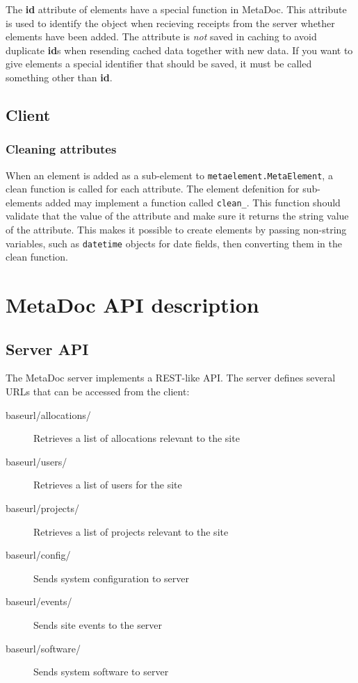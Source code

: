 \documentclass[titlepage, a4paper,10pt]{article}
\begin{document}
The \textbf{id} attribute of elements have a special function in MetaDoc. This 
attribute is used to identify the object when recieving receipts from the server 
whether elements have been added. The attribute is \textit{not} saved in caching 
to avoid duplicate \textbf{id}s when resending cached data together with new 
data. If you want to give elements a special identifier that should be saved, it 
must be called something other than \textbf{id}.

\subsection{Client}

\subsubsection{Cleaning attributes}

When an element is added as a sub-element to \texttt{metaelement.MetaElement}, a 
clean function is called for each attribute. The element defenition for 
sub-elements added may implement a function called 
\texttt{clean\_<attribute name>}. This function should validate that the value 
of the attribute and make sure it returns the string value of the attribute. 
This makes it possible to create elements by passing non-string variables, such 
as \texttt{datetime} objects for date fields, then converting them in the clean 
function. 

\newpage
\section{MetaDoc API description}

\subsection{Server API}

The MetaDoc server implements a REST-like API. The server defines several URLs 
that can be accessed from the client:

\begin{description}
    \item[baseurl/allocations/] Retrieves a list of allocations relevant to the 
        site
    \item[baseurl/users/] Retrieves a list of users for the site
    \item[baseurl/projects/] Retrieves a list of projects relevant to the site
    \item[baseurl/config/] Sends system configuration to server
    \item[baseurl/events/] Sends site events to the server
    \item[baseurl/software/] Sends system software to server
\end{description}
\end{document}
